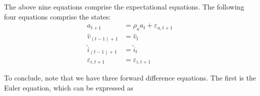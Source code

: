 \documentclass[12 pt, oneside]{article}
\theoremstyle{definition}
\theoremstyle{definition}
\theoremstyle{definition}
\newcommand{\fd}{\vspace{2.5mm}}
\begin{document}
\fd

The above nine equations comprise the expectational equations. The following four equations comprise the states:
\begin{align*}
  a_{t + 1} & = \rho_a a_t + \varepsilon_{a, t + 1}\\
  \hat{v}_{(t - 1) + 1} & = \hat{v}_t\\
  \tilde{i}_{(t - 1) + 1} & = \tilde{i}_t\\
  \varepsilon_{i, t + 1} & = \varepsilon_{i, t + 1}
\end{align*}


To conclude, note that we have three forward difference equations. The first is the Euler equation, which can be expressed as
\end{document}
